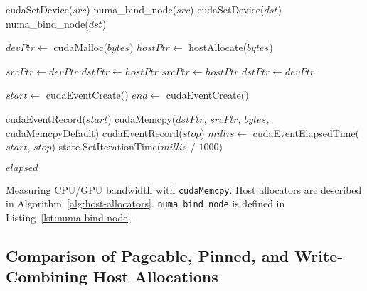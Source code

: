 \begin{algorithm}[H]
	\begin{algorithmic}[1]
		\Statex
		\State cudaSetDevice($src$)
		\Else {}
		\State numa\_bind\_node($src$)
		\EndIf
		\State cudaSetDevice($dst$)
		\Else {}
		\State numa\_bind\_node($dst$)
		\EndIf
		
		\State $devPtr \gets$ cudaMalloc($bytes$) 
		\State $hostPtr \gets$ hostAllocate($bytes$) 

		\State $srcPtr \gets devPtr$
		\State $dstPtr \gets hostPtr$
		\Else {}
		\State $srcPtr \gets hostPtr$
		\State $dstPtr \gets devPtr$
		\EndIf

		\State $start \gets$ cudaEventCreate()
		\State $end \gets$ cudaEventCreate()

		\State cudaEventRecord($start$)
		\State cudaMemcpy($dstPtr$, $srcPtr$, $bytes$, cudaMemcpyDefault)
		\State cudaEventRecord($stop$)
		\State $millis \gets$ cudaEventElapsedTime($start$, $stop$)
		\State state.SetIterationTime($millis$ / $1000$)
        \EndFor
		
		\Return $elapsed$
		\EndFunction
		
	\end{algorithmic}
	\caption[Measuring CPU/GPU bandwidth with \texttt{cudaMemcpy}]{
		Measuring CPU/GPU bandwidth with \texttt{cudaMemcpy}.
		Host allocators are described in Algorithm~\ref{alg:host-allocators}.
		\texttt{numa\_bind\_node} is defined in Listing~\ref{lst:numa-bind-node}.
	}
	\label{alg:explicit-cpu-gpu}
\end{algorithm}

\subsection{Comparison of Pageable, Pinned, and Write-Combining Host Allocations}
\label{sec:explicit-pageable-pinned-wc}

